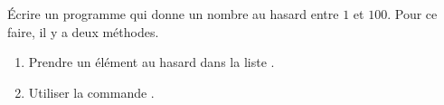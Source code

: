 
\begin{exercice}\label{exoPremiere-0050}

    Écrire un programme qui donne un nombre au hasard entre \( 1\) et \( 100\). Pour ce faire, il y a deux méthodes.
    \begin{enumerate}
        \item
            Prendre un élément au hasard dans la liste .
        \item
            Utiliser la commande .
    \end{enumerate}

\end{exercice}
